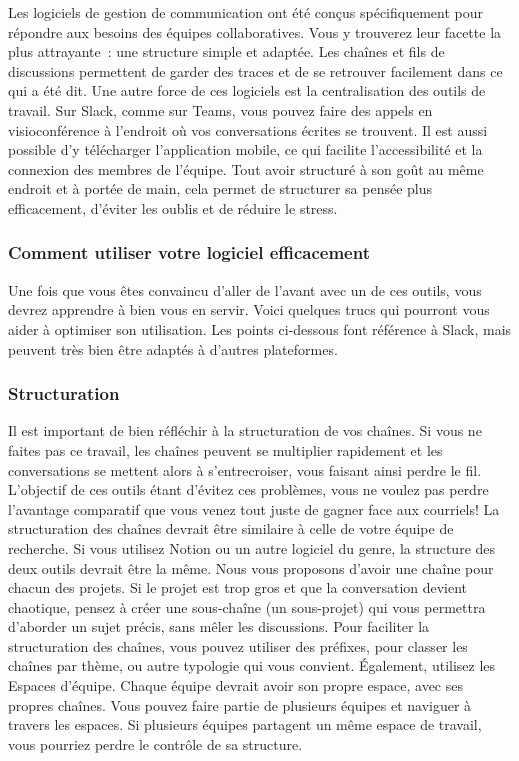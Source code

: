 \documentclass[
  letterpaper,
]{scrbook}
\begin{document}
Les logiciels de gestion de communication ont été conçus spécifiquement
pour répondre aux besoins des équipes collaboratives. Vous y trouverez
leur facette la plus attrayante~: une structure simple et adaptée. Les
chaînes et fils de discussions permettent de garder des traces et de se
retrouver facilement dans ce qui a été dit. Une autre force de ces
logiciels est la centralisation des outils de travail. Sur Slack, comme
sur Teams, vous pouvez faire des appels en visioconférence à l'endroit
où vos conversations écrites se trouvent. Il est aussi possible d'y
télécharger l'application mobile, ce qui facilite l'accessibilité et la
connexion des membres de l'équipe. Tout avoir structuré à son goût au
même endroit et à portée de main, cela permet de structurer sa pensée
plus efficacement, d'éviter les oublis et de réduire le stress.

\hypertarget{comment-utiliser-votre-logiciel-efficacement}{%
\subsubsection{Comment utiliser votre logiciel
efficacement}\label{comment-utiliser-votre-logiciel-efficacement}}

Une fois que vous êtes convaincu d'aller de l'avant avec un de ces
outils, vous devrez apprendre à bien vous en servir. Voici quelques
trucs qui pourront vous aider à optimiser son utilisation. Les points
ci-dessous font référence à Slack, mais peuvent très bien être adaptés à
d'autres plateformes.

\hypertarget{structuration}{%
\subsubsection{Structuration}\label{structuration}}

Il est important de bien réfléchir à la structuration de vos chaînes. Si
vous ne faites pas ce travail, les chaînes peuvent se multiplier
rapidement et les conversations se mettent alors à s'entrecroiser, vous
faisant ainsi perdre le fil. L'objectif de ces outils étant d'évitez ces
problèmes, vous ne voulez pas perdre l'avantage comparatif que vous
venez tout juste de gagner face aux courriels! La structuration des
chaînes devrait être similaire à celle de votre équipe de recherche. Si
vous utilisez Notion ou un autre logiciel du genre, la structure des
deux outils devrait être la même. Nous vous proposons d'avoir une chaîne
pour chacun des projets. Si le projet est trop gros et que la
conversation devient chaotique, pensez à créer une sous-chaîne (un
sous-projet) qui vous permettra d'aborder un sujet précis, sans mêler
les discussions. Pour faciliter la structuration des chaînes, vous
pouvez utiliser des préfixes, pour classer les chaînes par thème, ou
autre typologie qui vous convient. Également, utilisez les Espaces
d'équipe. Chaque équipe devrait avoir son propre espace, avec ses
propres chaînes. Vous pouvez faire partie de plusieurs équipes et
naviguer à travers les espaces. Si plusieurs équipes partagent un même
espace de travail, vous pourriez perdre le contrôle de sa structure.
\end{document}
